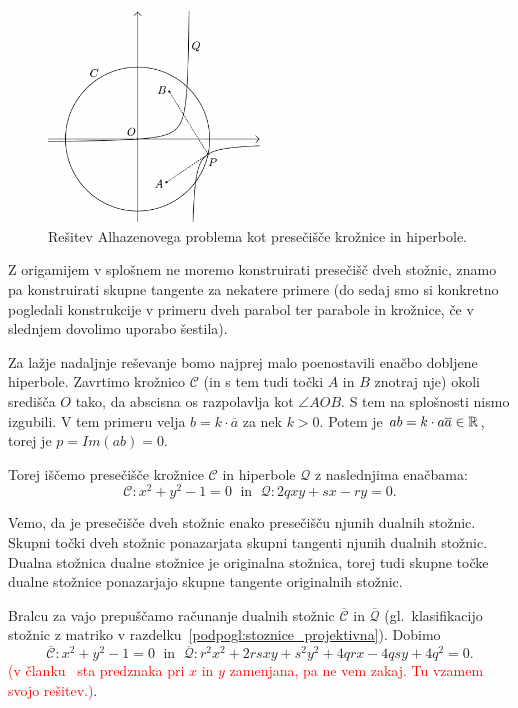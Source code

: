 \begin{figure}[h]
    \centering
    \includegraphics[width=0.5\textwidth]{images/alhazen/huygens2.png}
    \caption[Huygensova rešitev]{Rešitev Alhazenovega problema kot presečišče krožnice in hiperbole.}
    \label{fig:huygens2}
\end{figure} 

Z origamijem v splošnem ne moremo konstruirati presečišč dveh stožnic, znamo pa konstruirati skupne tangente za nekatere primere (do sedaj smo si konkretno pogledali konstrukcije v primeru dveh parabol ter parabole in krožnice, če v slednjem dovolimo uporabo šestila).

Za lažje nadaljnje reševanje bomo najprej malo poenostavili enačbo dobljene hiperbole. Zavrtimo krožnico $\mathcal{C}$ (in s tem tudi točki $A$ in $B$ znotraj nje) okoli središča $O$ tako, da abscisna os razpolavlja kot $\angle AOB$. S tem na splošnosti nismo izgubili. V tem primeru velja $b = k \cdot \overline{a}$ za nek $k > 0$. Potem je $ab = k \cdot a \overline{a} \in \mathbb R$, torej je $p = Im(ab) = 0$.

Torej iščemo presečišče krožnice $\mathcal{C}$ in hiperbole $\mathcal{Q}$ z naslednjima enačbama:
$$ \mathcal{C}: x^2 + y^2 - 1 = 0 \; \text{ in } \; \mathcal{Q}: 2qxy + sx - ry = 0. $$

Vemo, da je presečišče dveh stožnic enako presečišču njunih dualnih stožnic. Skupni točki dveh stožnic ponazarjata skupni tangenti njunih dualnih stožnic. Dualna stožnica dualne stožnice je originalna stožnica, torej tudi skupne točke dualne stožnice ponazarjajo skupne tangente originalnih stožnic.

Bralcu za vajo prepuščamo računanje dualnih stožnic $\mathcal{\overline{C}}$ in $\mathcal{\overline{Q}}$ (gl.\ klasifikacijo stožnic z matriko v razdelku~\ref{podpogl:stoznice_projektivna}). Dobimo
$$ \mathcal{\overline{C}}: x^2 + y^2 - 1 = 0 \; \text{ in } \; \mathcal{\overline{Q}}: r^2x^2 + 2rsxy + s^2y^2 + 4qrx - 4qsy + 4q^2 = 0. $$
\textcolor{red}{(v članku~\cite{alperin2002} sta predznaka pri $x$ in $y$ zamenjana, pa ne vem zakaj. Tu vzamem svojo rešitev.)}.

